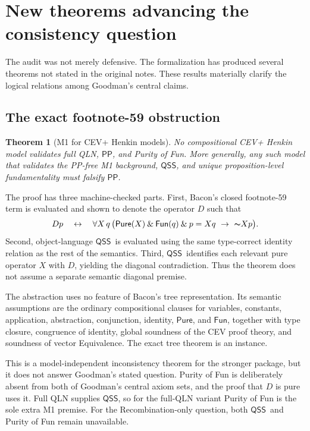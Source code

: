 \documentclass[12pt,leqno]{article}
\newcommand{\AND}{\ensuremath{\mathbin{\&}}}
\newcommand{\IFF}{\ensuremath{\leftrightarrow}}
\newcommand{\IC}{\ensuremath{\rightarrow}}
\newcommand{\NOT}{\ensuremath{\text{$\thicksim$}}}
\theoremstyle{plain}
\newtheorem{theorem}{Theorem}
\theoremstyle{definition}
\newcommand{\Pure}{\ensuremath{\mathsf{Pure}}}
\newcommand{\Fun}{\ensuremath{\mathsf{Fun}}}
\newcommand{\PP}{\ensuremath{\mathsf{PP}}}
\newcommand{\QSS}{\ensuremath{\mathsf{QSS}}}
\begin{document}
\section{New theorems advancing the consistency question}

The audit was not merely defensive.  The formalization has produced several
theorems not stated in the original notes.  These results materially clarify
the logical relations among Goodman's central claims.

\subsection{The exact footnote-59 obstruction}

\begin{theorem}[M1 for CEV+ Henkin models]
No compositional CEV+ Henkin model validates full QLN, \PP, and Purity of
Fun.  More generally, any such model that validates the PP-free M1
background, \QSS, and unique proposition-level fundamentality must falsify
\PP.
\end{theorem}

\noindent
The proof has three machine-checked parts.  First, Bacon's closed
footnote-59 term is evaluated and shown to denote the operator \(D\) such
that
\[
 Dp
 \quad\IFF\quad
 \forall X\,q\,
 \bigl(
   \Pure(X)\AND\Fun(q)\AND p=Xq
   \ \IC\ \NOT Xp
 \bigr).
\]
Second, object-language \QSS\ is evaluated using the same type-correct
identity relation as the rest of the semantics.  Third, \QSS\ identifies
each relevant pure operator \(X\) with \(D\), yielding the diagonal
contradiction.  Thus the theorem does not assume a separate semantic
diagonal premise.

The abstraction uses no feature of Bacon's tree representation.  Its
semantic assumptions are the ordinary compositional clauses for variables,
constants, application, abstraction, conjunction, identity, \(\Pure\), and
\(\Fun\), together with type closure, congruence of identity, global
soundness of the CEV proof theory, and soundness of vector Equivalence.  The
exact tree theorem is an instance.

This is a model-independent inconsistency theorem for the stronger package,
but it does not answer Goodman's stated question.  Purity of Fun is
deliberately absent from both of Goodman's central axiom sets, and the proof
that \(D\) is pure uses it.  Full QLN supplies \QSS, so for the full-QLN
variant Purity of Fun is the sole extra M1 premise.  For the
Recombination-only question, both \QSS\ and Purity of Fun remain unavailable.
\end{document}
